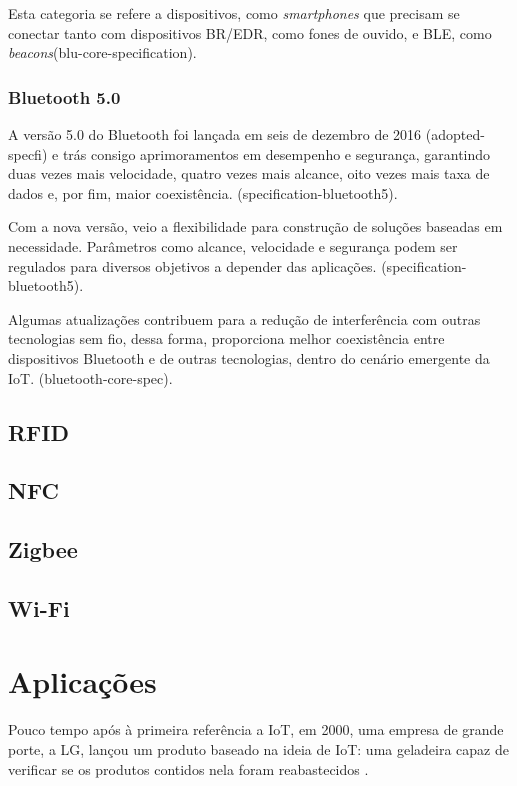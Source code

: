 \documentclass[
	article,			%
	11pt,				%
	oneside,			%
	a4paper,			%
	section=TITLE,		%
	subsection=TITLE,	%
	english,			%
	brazil,				%
	sumario=tradicional
	]{abntex2}
\begin{document}
%
Esta categoria se refere a dispositivos, como \textit{smartphones} que precisam 
se conectar tanto com dispositivos BR/EDR, como fones de ouvido, e BLE, como 
\textit{beacons}(blu-core-specification).

\subsubsection{Bluetooth 5.0}

A versão 5.0 do Bluetooth foi lançada em seis de dezembro de 2016 (adopted-specfi) e trás consigo 
aprimoramentos em desempenho e segurança, garantindo duas vezes mais velocidade, quatro vezes mais 
alcance, oito vezes mais taxa de dados e, por fim, maior coexistência.  (specification-bluetooth5).

Com a nova versão, veio a flexibilidade para construção de soluções baseadas em necessidade. 
Parâmetros como alcance, velocidade e segurança podem ser regulados para diversos objetivos a 
depender das aplicações. (specification-bluetooth5).

Algumas atualizações contribuem para a redução de interferência com outras tecnologias sem fio, 
dessa forma, proporciona melhor coexistência entre dispositivos Bluetooth e de outras tecnologias, 
dentro do cenário emergente da IoT. (bluetooth-core-spec).




\subsection{RFID}

\subsection{NFC}

\subsection{Zigbee}

\subsection{Wi-Fi} %

\section{Aplicações}

Pouco tempo após à primeira referência a IoT, em 2000, uma empresa de grande porte, a LG, lançou 
um produto baseado na ideia de IoT: uma geladeira capaz de verificar se os produtos contidos nela 
foram reabastecidos \cite{survey-suresh}.
\end{document}
